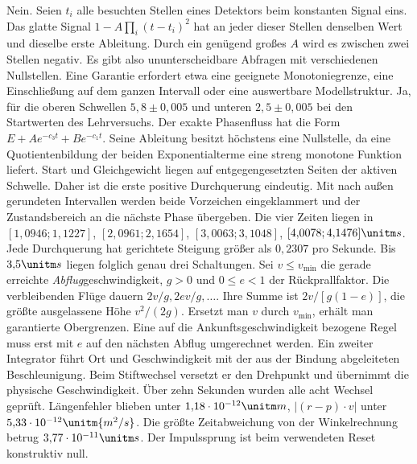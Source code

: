 Nein. Seien \(t_i\) alle besuchten Stellen eines Detektors beim konstanten Signal eins. Das glatte Signal \(1-A\prod_i(t-t_i)^2\) hat an jeder dieser Stellen denselben Wert und dieselbe erste Ableitung. Durch ein genügend großes \(A\) wird es zwischen zwei Stellen negativ. Es gibt also ununterscheidbare Abfragen mit verschiedenen Nullstellen. Eine Garantie erfordert etwa eine geeignete Monotoniegrenze, eine Einschließung auf dem ganzen Intervall oder eine auswertbare Modellstruktur.
Ja, für die oberen Schwellen \(5{,}8\pm0{,}005\) und unteren \(2{,}5\pm0{,}005\) bei den Startwerten des Lehrversuchs. Der exakte Phasenfluss hat die Form \(E+A e^{-c_3t}+B e^{-c_1t}\). Seine Ableitung besitzt höchstens eine Nullstelle, da eine Quotientenbildung der beiden Exponentialterme eine streng monotone Funktion liefert. Start und Gleichgewicht liegen auf entgegengesetzten Seiten der aktiven Schwelle. Daher ist die erste positive Durchquerung eindeutig.
Mit nach außen gerundeten Intervallen werden beide Vorzeichen eingeklammert und der Zustandsbereich an die nächste Phase übergeben. Die vier Zeiten liegen in \([1{,}0946;1{,}1227]\), \([2{,}0961;2{,}1654]\), \([3{,}0063;3{,}1048]\), \([4{,}0078;4{,}1476]\unitm s\). Jede Durchquerung hat gerichtete Steigung größer als \(0{,}2307\) pro Sekunde. Bis \(3{,}5\unitm s\) liegen folglich genau drei Schaltungen.
Sei \(v\le v_{\min}\) die gerade erreichte \emph{Abflug}geschwindigkeit, \(g>0\) und \(0\le e<1\) der Rückprallfaktor. Die verbleibenden Flüge dauern \(2v/g,2ev/g,\ldots\). Ihre Summe ist \(2v/[g(1-e)]\), die größte ausgelassene Höhe \(v^2/(2g)\). Ersetzt man \(v\) durch \(v_{\min}\), erhält man garantierte Obergrenzen. Eine auf die Ankunftsgeschwindigkeit bezogene Regel muss erst mit \(e\) auf den nächsten Abflug umgerechnet werden.
Ein zweiter Integrator führt Ort und Geschwindigkeit mit der aus der Bindung abgeleiteten Beschleunigung. Beim Stiftwechsel versetzt er den Drehpunkt und übernimmt die physische Geschwindigkeit. Über zehn Sekunden wurden alle acht Wechsel geprüft. Längenfehler blieben unter \(1{,}18\cdot10^{-12}\unitm m\), \(|(r-p)\cdot v|\) unter \(5{,}33\cdot10^{-12}\unitm{m^2/s}\). Die größte Zeitabweichung von der Winkelrechnung betrug \(3{,}77\cdot10^{-11}\unitm s\). Der Impulssprung ist beim verwendeten Reset konstruktiv null.

